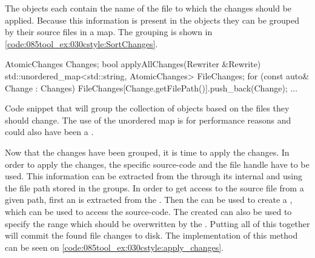 The  objects each contain the name of the file to which the changes should be applied. Because this information is present in the objects they can be grouped by their source files in a map. The grouping is shown in \cref{code:085tool_ex:030cstyle:SortChanges}.

\begin{listing}[H]
    \begin{cppcode}
AtomicChanges Changes;
bool applyAllChanges(Rewriter &Rewrite) {
    std::unordered_map<std::string, AtomicChanges> FileChanges;
    for (const auto& Change : Changes) {
        FileChanges[Change.getFilePath()].push_back(Change);
    }
    ...
}
    \end{cppcode}
    \caption{Code snippet that will group the collection of  objects based on the files they should change. The use of the unordered map is for performance reasons and could also have been a .}
    \label{code:085tool_ex:030cstyle:SortChanges}
\end{listing}

Now that the changes have been grouped, it is time to apply the changes. In order to apply the changes, the specific source-code and the file handle have to be used. This information can be extracted from the  through its internal  and  using the file path stored in the groups. In order to get access to the source file from a given path, first an  is extracted from the . Then the  can be used to create a , which can be used to access the source-code. The created  can also be used to specify the range which should be overwritten by the . Putting all of this together will commit the found file changes to disk. The implementation of this method can be seen on \cref{code:085tool_ex:030cstyle:apply_changes}.

